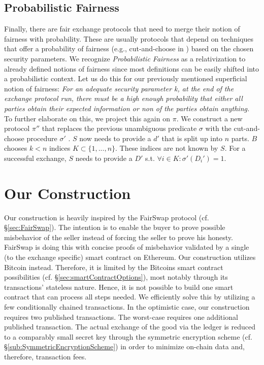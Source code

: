 \documentclass{cacthesis}
\newcounter{protocol}
\begin{document}
        \section{Probabilistic Fairness}
        \label{sec:ProbabilisticFairness}
        Finally, there are fair exchange protocols that need to merge their notion of fairness with probability. These are usually protocols that depend on techniques that offer a probability of fairness (e.g., cut-and-choose in \cite{DELGADOSEGURA2020832}) based on the chosen security parameters. We recognize \textit{Probabilistic Fairness} as a relativization to already defined notions of fairness since most definitions can be easily shifted into a probabilistic context. Let us do this for our previously mentioned superficial notion of fairness: \textit{For an adequate security parameter k, at the end of the exchange protocol run, there must be a high enough probability that either all parties obtain their expected information or non of the parties obtain anything.} \\
        To further elaborate on this, we project this again on $\pi$. We construct a new protocol $\pi''$ that replaces the previous unambiguous predicate $\sigma$ with the cut-and-choose procedure $\sigma'$ . $S$ now needs to provide a $d'$ that is split up into $n$ parts. $B$ chooses $k < n$ indices $K \subset \{1, ..., n\}$. These indices are not known by $S$. For a successful exchange, $S$ needs to provide a $D'$ s.t. $\forall i\in K:\sigma'\left( D_{i}'\right) =1$. \\

		
	\chapter{Our Construction}
	   \label{ch:Construction}
	   Our construction is heavily inspired by the FairSwap protocol (cf. §\ref{sec:FairSwap}). The intention is to enable the buyer to prove possible misbehavior of the seller instead of forcing the seller to prove his honesty. FairSwap is doing this with concise proofs of misbehavior validated by a single (to the exchange specific) smart contract on Ethereum. Our construction utilizes Bitcoin instead. Therefore, it is limited by the Bitcoins smart contract possibilities (cf. §\ref{sec:smartContractOptions}), most notably through its transactions' stateless nature. Hence, it is not possible to build one smart contract that can process all steps needed. We efficiently solve this by utilizing a few conditionally chained transactions. In the optimistic case, our construction requires two published transactions. The worst-case requires one additional published transaction. The actual exchange of the good via the ledger is reduced to a comparably small secret key through the symmetric encryption scheme (cf. §\ref{sub:SymmetricEncryptionScheme}) in order to minimize on-chain data and, therefore, transaction fees.
	   
\end{document}
